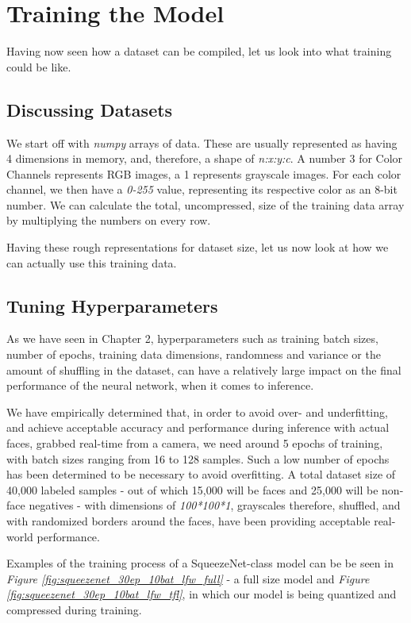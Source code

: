\section{Training the Model}
Having now seen how a dataset can be compiled, let us look into what training could be like. 
\subsection{Discussing Datasets}
We start off with \textit{numpy} arrays of data. These are usually represented as having 4 dimensions in memory, and, therefore, a shape of \textit{n:x:y:c}. A number 3 for Color Channels represents RGB images, a 1 represents grayscale images. For each color channel, we then have a \textit{0-255} value, representing its respective color as an 8-bit number. We can calculate the total, uncompressed, size of the training data array by multiplying the numbers on every row. \par
Having these rough representations for dataset size, let us now look at how we can actually use this training data.


\subsection{Tuning Hyperparameters}
As we have seen in Chapter 2, hyperparameters such as training batch sizes, number of epochs, training data dimensions, randomness and variance or the amount of shuffling in the dataset, can have a relatively large impact on the final performance of the neural network, when it comes to inference. \par
We have empirically determined that, in order to avoid over- and underfitting, and achieve acceptable accuracy and performance during inference with actual faces, grabbed real-time from a camera, we need around 5 epochs of training, with batch sizes ranging from 16 to 128 samples. Such a low number of epochs has been determined to be necessary to avoid overfitting. A total dataset size of 40,000 labeled samples - out of which 15,000 will be faces and 25,000 will be non-face negatives - with dimensions of \textit{100*100*1}, grayscales therefore, shuffled, and with randomized borders around the faces, have been providing acceptable real-world performance. \par
Examples of the training process of a SqueezeNet-class model can be be seen in \textit{Figure \ref{fig:squeezenet_30ep_10bat_lfw_full}} - a full size model and \textit{Figure \ref{fig:squeezenet_30ep_10bat_lfw_tfl}}, in which our model is being quantized and compressed during training.

